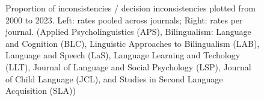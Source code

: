 \documentclass[
  doc,
  longtable,
  nolmodern,
  notxfonts,
  notimes,
  colorlinks=true,linkcolor=blue,citecolor=blue,urlcolor=blue]{apa7}
\begin{document}
\begin{figure}

\caption{\label{fig-year-prop}Proportion of inconsistencies / decision
inconsistencies plotted from 2000 to 2023. Left: rates pooled across
journals; Right: rates per journal. (Applied Psycholinguistics (APS),
Bilingualism: Language and Cognition (BLC), Linguistic Approaches to
Bilingualism (LAB), Language and Speech (LaS), Language Learning and
Techology (LLT), Journal of Language and Social Psychology (LSP),
Journal of Child Language (JCL), and Studies in Second Language
Acquisition (SLA))}


\end{figure}%
\end{document}
